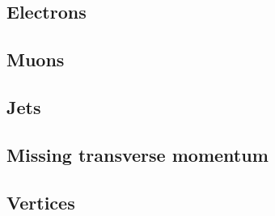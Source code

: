 
\subsection{Electrons}
\label{sec:objects:electrons}

\subsection{Muons}
\label{sec:objects:muons}

\subsection{Jets}
\label{sec:objects:jets}

\subsection{Missing transverse momentum}
\label{sec:objects:met}

\subsection{Vertices}
\label{sec:objects:vertices}
